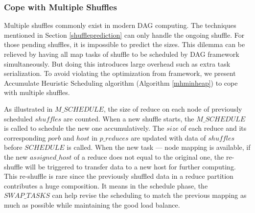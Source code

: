 \subsubsection{Cope with Multiple Shuffles}
Multiple shuffles commonly exist in modern DAG computing. The techniques mentioned in Section \ref{shuffleprediction} can only handle the ongoing shuffle. For those pending shuffles, it is impossible to predict the sizes. This dilemma can be relieved by having all map tasks of shuffle to be scheduled by DAG framework simultaneously. But doing this introduces large overhead such as extra task serialization. To avoid violating the optimization from framework, we present Accumulate Heuristic Scheduling algorithm (Algorithm \ref{mhminheap}) to cope with multiple shuffles.

As illustrated in $M\_SCHEDULE$, the size of reduce on each node of previously scheduled $shuffles$ are counted. When a new shuffle starts, the $M\_SCHEDULE$ is called to schedule the new one accumulatively. The $size$ of each reduce and its corresponding $porb$ and $host$ in $p\_reduces$ are updated with data of $shuffles$ before $SCHEDULE$ is called. When the new task --- node mapping is available, if the new $assigned\_host$ of a reduce does not equal to the original one, the re-shuffle will be triggered to transfer data to a new host for further computing. This re-shuffle is rare since the previously shuffled data in a reduce partition contributes a huge composition. It means in the schedule phase, the $SWAP\_TASKS$ can help revise the scheduling to match the previous mapping as much as possible while maintaining the good load balance.

